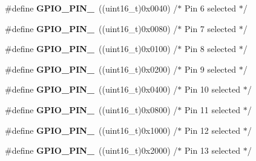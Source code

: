 \begin{DoxyCompactItemize}
\item 
\#define {\bfseries G\+P\+I\+O\+\_\+\+P\+I\+N\+\_}~((uint16\+\_\+t)0x0040)  /$\ast$ Pin 6 selected    $\ast$/\hypertarget{group___g_p_i_o__pins__define_ga9089f18f20ec88ee38ce6f27389e6d7e}{}\label{group___g_p_i_o__pins__define_ga9089f18f20ec88ee38ce6f27389e6d7e}

\item 
\#define {\bfseries G\+P\+I\+O\+\_\+\+P\+I\+N\+\_}~((uint16\+\_\+t)0x0080)  /$\ast$ Pin 7 selected    $\ast$/\hypertarget{group___g_p_i_o__pins__define_ga482cb86c2f036e630661a41e8986bcfe}{}\label{group___g_p_i_o__pins__define_ga482cb86c2f036e630661a41e8986bcfe}

\item 
\#define {\bfseries G\+P\+I\+O\+\_\+\+P\+I\+N\+\_}~((uint16\+\_\+t)0x0100)  /$\ast$ Pin 8 selected    $\ast$/\hypertarget{group___g_p_i_o__pins__define_gaf5eb6a42a4428e236bd4fd08ade71e7a}{}\label{group___g_p_i_o__pins__define_gaf5eb6a42a4428e236bd4fd08ade71e7a}

\item 
\#define {\bfseries G\+P\+I\+O\+\_\+\+P\+I\+N\+\_}~((uint16\+\_\+t)0x0200)  /$\ast$ Pin 9 selected    $\ast$/\hypertarget{group___g_p_i_o__pins__define_ga4c503cb4a0dc0d18261080051d9c2daf}{}\label{group___g_p_i_o__pins__define_ga4c503cb4a0dc0d18261080051d9c2daf}

\item 
\#define {\bfseries G\+P\+I\+O\+\_\+\+P\+I\+N\+\_}~((uint16\+\_\+t)0x0400)  /$\ast$ Pin 10 selected   $\ast$/\hypertarget{group___g_p_i_o__pins__define_gac102c0123cb8bcadc5b590cd940b9e20}{}\label{group___g_p_i_o__pins__define_gac102c0123cb8bcadc5b590cd940b9e20}

\item 
\#define {\bfseries G\+P\+I\+O\+\_\+\+P\+I\+N\+\_}~((uint16\+\_\+t)0x0800)  /$\ast$ Pin 11 selected   $\ast$/\hypertarget{group___g_p_i_o__pins__define_ga79f6797ea82c1fb25cd6c0e14e44d312}{}\label{group___g_p_i_o__pins__define_ga79f6797ea82c1fb25cd6c0e14e44d312}

\item 
\#define {\bfseries G\+P\+I\+O\+\_\+\+P\+I\+N\+\_}~((uint16\+\_\+t)0x1000)  /$\ast$ Pin 12 selected   $\ast$/\hypertarget{group___g_p_i_o__pins__define_ga95f9ce5911fa8b209defb969db93ced3}{}\label{group___g_p_i_o__pins__define_ga95f9ce5911fa8b209defb969db93ced3}

\item 
\#define {\bfseries G\+P\+I\+O\+\_\+\+P\+I\+N\+\_}~((uint16\+\_\+t)0x2000)  /$\ast$ Pin 13 selected   $\ast$/\hypertarget{group___g_p_i_o__pins__define_ga173023dced8f9692ade0f1176558ef70}{}\label{group___g_p_i_o__pins__define_ga173023dced8f9692ade0f1176558ef70}


\end{DoxyCompactItemize}
